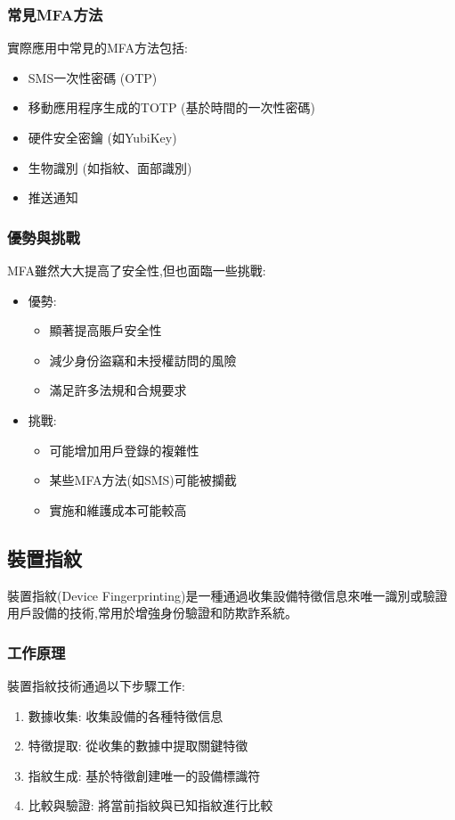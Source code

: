 \subsubsection{常見MFA方法}
實際應用中常見的MFA方法包括:

\begin{itemize}
  \item SMS一次性密碼 (OTP)
  \item 移動應用程序生成的TOTP (基於時間的一次性密碼)
  \item 硬件安全密鑰 (如YubiKey)
  \item 生物識別 (如指紋、面部識別)
  \item 推送通知
\end{itemize}

\subsubsection{優勢與挑戰}
MFA雖然大大提高了安全性,但也面臨一些挑戰:
\begin{itemize}
  \item 優勢:
        \begin{itemize}
          \item 顯著提高賬戶安全性
          \item 減少身份盜竊和未授權訪問的風險
          \item 滿足許多法規和合規要求
        \end{itemize}
  \item 挑戰:
        \begin{itemize}
          \item 可能增加用戶登錄的複雜性
          \item 某些MFA方法(如SMS)可能被攔截
          \item 實施和維護成本可能較高
        \end{itemize}
\end{itemize}

\subsection{裝置指紋}
裝置指紋(Device Fingerprinting)是一種通過收集設備特徵信息來唯一識別或驗證用戶設備的技術,常用於增強身份驗證和防欺詐系統。
\subsubsection{工作原理}
裝置指紋技術通過以下步驟工作:
\begin{enumerate}
  \item 數據收集: 收集設備的各種特徵信息
  \item 特徵提取: 從收集的數據中提取關鍵特徵
  \item 指紋生成: 基於特徵創建唯一的設備標識符
  \item 比較與驗證: 將當前指紋與已知指紋進行比較
\end{enumerate}

